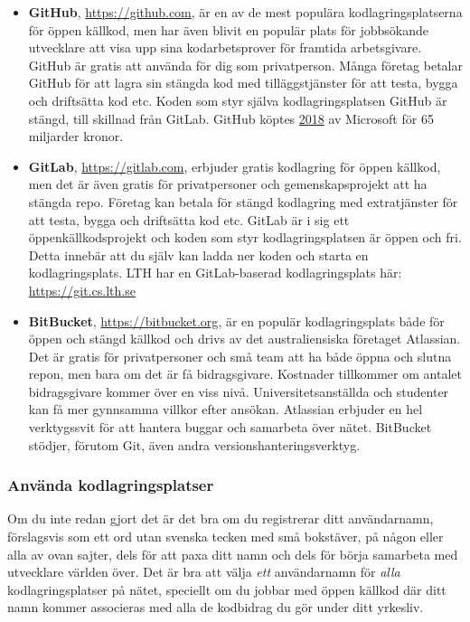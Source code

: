 \begin{itemize}
\item  \textbf{GitHub}, \url{https://github.com}, är en av de mest populära kodlagringsplatserna för öppen källkod, men har även blivit en populär plats för jobbsökande utvecklare att visa upp sina  kodarbetsprover för framtida arbetsgivare. GitHub är gratis att använda för dig som privatperson. Många företag betalar GitHub för att lagra sin stängda kod med tilläggstjänster för att testa, bygga och driftsätta kod etc. Koden som styr själva kodlagringsplatsen GitHub är stängd, till skillnad från GitLab. GitHub köptes \href{https://computersweden.idg.se/2.2683/1.703485/microsoft-kop-github}{2018} av Microsoft för 65 miljarder kronor.

\item \textbf{GitLab}, \url{https://gitlab.com}, erbjuder gratis kodlagring för öppen källkod, men det är även gratis för privatpersoner och gemenskapsprojekt att ha stängda repo. Företag kan betala för stängd kodlagring med extratjänster för att testa, bygga och driftsätta kod etc. GitLab är i sig ett öppenkällkodsprojekt och koden som styr kodlagringsplatsen är öppen och fri. Detta innebär att du själv kan ladda ner koden och starta en kodlagringsplats. LTH har en GitLab-baserad kodlagringsplats här: \url{https://git.cs.lth.se}

\item \textbf{BitBucket}, \url{https://bitbucket.org}, är en populär kodlagringsplats både för öppen och stängd källkod och drivs av det australiensiska företaget Atlassian. Det är gratis för privatpersoner och små team att ha både öppna och slutna repon, men bara om det är få bidragsgivare. Kostnader tillkommer om antalet bidragsgivare kommer över en viss nivå. Universitetsanställda och studenter kan få mer gynnsamma villkor efter ansökan. Atlassian erbjuder en hel verktygssvit för att hantera buggar och samarbeta över nätet. BitBucket stödjer, förutom Git, även andra versionshanteringsverktyg.

\end{itemize}

\subsubsection{Använda kodlagringsplatser}

Om du inte redan gjort det är det bra om du registrerar ditt användarnamn, förslagsvis  som ett ord utan svenska tecken med små bokstäver, på någon eller alla av ovan sajter, dels för att paxa ditt namn och dels för börja samarbeta med utvecklare världen över. Det är bra att välja \textit{ett} användarnamn för \textit{alla} kodlagringsplatser på nätet, speciellt om du jobbar med öppen källkod där ditt namn kommer associeras med alla de kodbidrag du gör under ditt yrkesliv.

